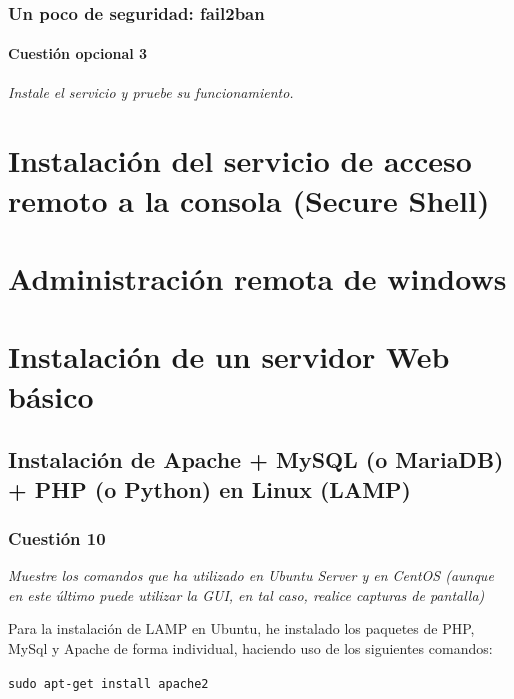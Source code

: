 \subsubsection{Un poco de seguridad: fail2ban}
\paragraph{Cuestión opcional 3}
\textit{Instale el servicio y pruebe su funcionamiento.}


\section{Instalación del servicio de acceso remoto a la consola (Secure Shell)}


\section{Administración remota de windows}


\section{Instalación de un servidor Web básico}

\subsection{Instalación de Apache + MySQL (o MariaDB) + PHP (o Python) en Linux (LAMP)}





\subsubsection{Cuestión 10}
\textit{Muestre los comandos que ha utilizado en Ubuntu Server y en CentOS (aunque en este último puede utilizar la GUI, en tal caso, realice capturas de pantalla)}
\newline

Para la instalación de LAMP en Ubuntu, he instalado los paquetes de  PHP, MySql y Apache de forma individual, haciendo uso de los siguientes comandos: \cite{l1 ,l2 ,l3} \newline

\hskip3.5cm \texttt{sudo apt-get install apache2 }

